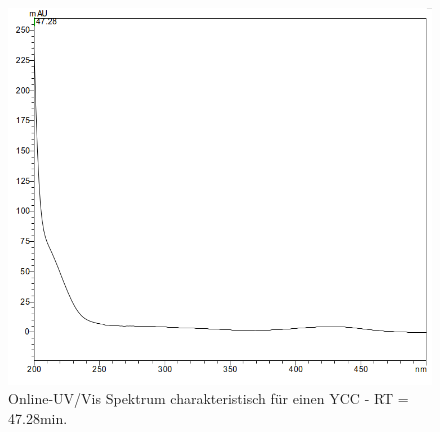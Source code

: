 \begin{figure}[!htbp]
  \centering
  \includegraphics[width=\textwidth]{figures/Kapitel6/Reaktion3h/YCC4728.png}
  \caption{}
  \label{fig:YCC4728}
  \caption[Online-UV/Vis Spektren mit der Charakteristik eines YCC bei 47.28min., Quelle: Autor]{Online-UV/Vis Spektrum charakteristisch für einen  \gls{YCC} - RT = 47.28min.}
\end{figure}

